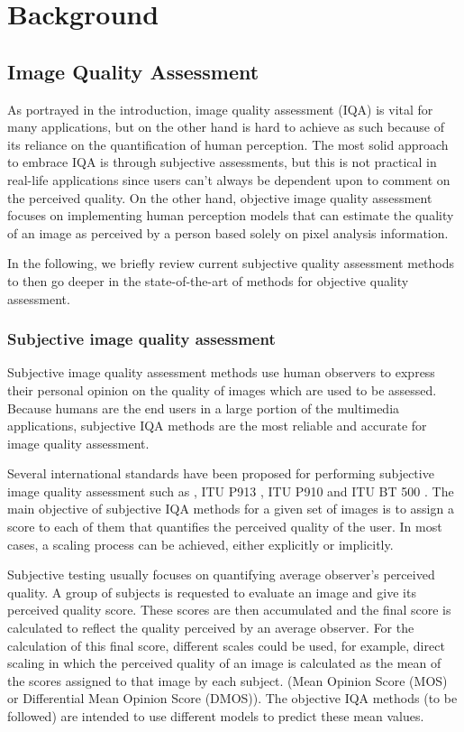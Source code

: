 \chapter{Background}

\section{Image Quality Assessment}

As portrayed in the introduction, image quality assessment (IQA) is vital for many applications, but on the other hand is hard to achieve as such because of its reliance on the quantification of human perception. 
The most solid approach to embrace IQA is through subjective assessments, but this is not practical in real-life applications since users can’t always be dependent upon to comment on the perceived quality. 
On the other hand, objective image quality assessment focuses on implementing human perception models that can estimate the quality of an image as perceived by a person based solely on pixel analysis information.

In the following, we briefly review current subjective quality assessment methods to then go deeper in the state-of-the-art of methods for objective quality assessment.

\subsection{Subjective image quality assessment}

Subjective image quality assessment methods use human observers to express their personal opinion on the quality of images which are used to be assessed. 
Because humans are the end users in a large portion of the multimedia applications, subjective IQA methods are the most reliable and accurate for image quality assessment.

Several international standards have been proposed for performing subjective image quality assessment such as , ITU P913 \cite{ITU2014}, ITU P910 \cite{ITU-TRecommendationP.9102008} and ITU BT 500 \cite{Bt2002}. 
The main objective of subjective IQA methods for a given set of images is to assign a score to each of them that quantifies the perceived quality of the user. In most cases, a scaling process can be achieved, either explicitly or implicitly.

Subjective testing usually focuses on quantifying average observer's perceived quality. 
A group of subjects is requested to evaluate an image and give its perceived quality score.
These scores are then accumulated and the final score is calculated to reflect the quality perceived by an average observer. 
For the calculation of this final score, different scales could be used, for example, direct scaling in which the perceived quality of an image is calculated as the mean of the scores assigned to that image by each subject. (Mean Opinion Score (MOS) or Differential Mean Opinion Score (DMOS)). 
The objective IQA methods (to be followed) are intended to use different models to predict these mean values.

